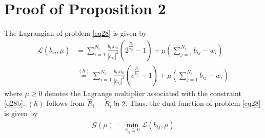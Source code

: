 \documentclass[journal]{IEEEtran}
\begin{document}
\section{Proof of Proposition 2}
The Lagrangian of problem \eqref{eq28} is given by
\begin{align}
\mathcal{L}\left(b_{ij}, \mu\right) &=  \sum\limits_{i = 1}^{N_i} \frac{b_{ij}n_0}{\left|h_{ij}\right|^2}\left(2^{\frac{\tilde{R}_i}{b_{ij}}} - 1\right) + \mu\left(\sum_{j = 1}^{N_i}b_{ij} - w_i\right) \nonumber \\ 
& \overset{\left(h\right)}{=} \sum\limits_{i = 1}^{N_i} \frac{b_{ij}n_0}{\left|h_{ij}\right|^2}\left(e^{\frac{\hat{R}_i}{b_{ij}}} - 1\right) + \mu\left(\sum_{j = 1}^{N_i}b_{ij} - w_i\right) 
\end{align}
where $\mu \geq 0$ denotes the Lagrange multiplier associated with the constraint \eqref{q28b}. $\left(h\right)$ follows from $\hat{R}_i = \tilde{R}_i \ln2$. Thus, the dual function of problem \eqref{eq28} is given by
\begin{align}
\mathcal{G}\left(\mu\right) = \min_{b_{ij}\geq 0} \mathcal{L}\left(b_{ij},\mu\right)
\end{align}
\end{document}
